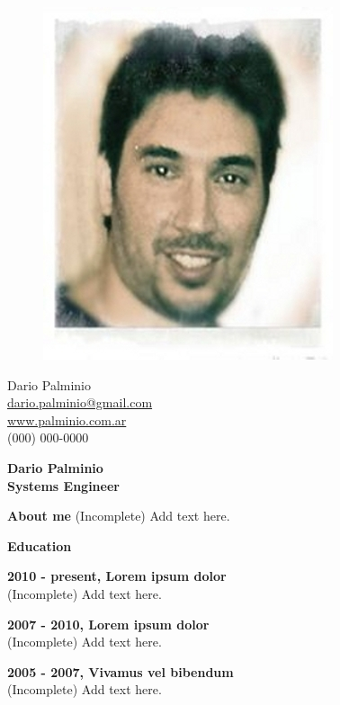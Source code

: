 \documentclass[a4paper,12pt,final]{memoir}
\newcommand{\Sep}{\vspace{1.5em}}
\newcommand{\SmallSep}{\vspace{0.5em}}
\newenvironment{AboutMe}
	{\ignorespaces\textbf{\color{RoyalBlue} About me}}
	{\Sep\ignorespacesafterend}
\newcommand{\CVSection}[1]
	{\Large\textbf{#1}\par
	\SmallSep\normalsize\normalfont}
\newcommand{\CVItem}[1]
	{\textbf{\color{RoyalBlue} #1}}
\begin{document}
\begin{figure}
	\hfill
	\includegraphics[width=0.6\columnwidth]{photo}
	\vspace{-7cm}
\end{figure}

\begin{flushright}\small
	Dario Palminio \\
	\url{dario.palminio@gmail.com}  \\
	\url{www.palminio.com.ar} \\
	(000) 000-0000
\end{flushright}\normalsize
\framebreak


\Huge\bfseries {\color{RoyalBlue} Dario Palminio} \\
\Large\bfseries  Systems Engineer \\

\normalsize\normalfont

\begin{AboutMe}
(Incomplete) Add text here.
\end{AboutMe}

\CVSection{Education}
\CVItem{2010 - present, Lorem ipsum dolor}\\
(Incomplete) Add text here.
\SmallSep

\CVItem{2007 - 2010, Lorem ipsum dolor}\\
(Incomplete) Add text here.
\SmallSep

\CVItem{2005 - 2007, Vivamus vel bibendum}\\
(Incomplete) Add text here.
\Sep
\end{document}
